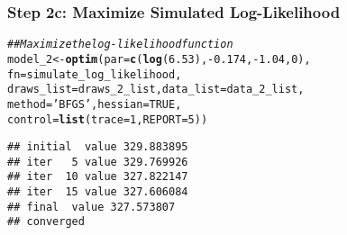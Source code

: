 \documentclass{beamer}\usepackage[]{graphicx}\usepackage[]{color}
\makeatletter
\newcommand{\hlnum}[1]{\textcolor[rgb]{0.686,0.059,0.569}{#1}}%
\newcommand{\hlstr}[1]{\textcolor[rgb]{0.192,0.494,0.8}{#1}}%
\newcommand{\hlcom}[1]{\textcolor[rgb]{0.678,0.584,0.686}{\textit{#1}}}%
\newcommand{\hlopt}[1]{\textcolor[rgb]{0,0,0}{#1}}%
\newcommand{\hlstd}[1]{\textcolor[rgb]{0.345,0.345,0.345}{#1}}%
\newcommand{\hlkwb}[1]{\textcolor[rgb]{0.69,0.353,0.396}{#1}}%
\newcommand{\hlkwc}[1]{\textcolor[rgb]{0.333,0.667,0.333}{#1}}%
\newcommand{\hlkwd}[1]{\textcolor[rgb]{0.737,0.353,0.396}{\textbf{#1}}}%
\newenvironment{kframe}{%
 \def\at@end@of@kframe{}%
 \ifinner\ifhmode%
  \def\at@end@of@kframe{\end{minipage}}%
  \begin{minipage}{\columnwidth}%
 \fi\fi%
 \def\FrameCommand##1{\hskip\@totalleftmargin \hskip-\fboxsep
 \colorbox{shadecolor}{##1}\hskip-\fboxsep
     \hskip-\linewidth \hskip-\@totalleftmargin \hskip\columnwidth}%
 \MakeFramed {\advance\hsize-\width
   \@totalleftmargin\z@ \linewidth\hsize
   \@setminipage}}%
 {\par\unskip\endMakeFramed%
 \at@end@of@kframe}
\newenvironment{knitrout}{}{} %
\makeatother
\begin{document}
\begin{frame}[fragile]\frametitle{Step 2c: Maximize Simulated Log-Likelihood}
\begin{knitrout}\footnotesize
{}\color{fgcolor}\begin{kframe}
\begin{alltt}
\hlcom{## Maximize the log-likelihood function}
\hlstd{model_2} \hlkwb{<-} \hlkwd{optim}\hlstd{(}\hlkwc{par} \hlstd{=} \hlkwd{c}\hlstd{(}\hlkwd{log}\hlstd{(}\hlnum{6.53}\hlstd{),} \hlopt{-}\hlnum{0.174}\hlstd{,} \hlopt{-}\hlnum{1.04}\hlstd{,} \hlnum{0}\hlstd{),}
                 \hlkwc{fn} \hlstd{= simulate_log_likelihood,}
                 \hlkwc{draws_list} \hlstd{= draws_2_list,} \hlkwc{data_list} \hlstd{= data_2_list,}
                 \hlkwc{method} \hlstd{=} \hlstr{'BFGS'}\hlstd{,} \hlkwc{hessian} \hlstd{=} \hlnum{TRUE}\hlstd{,}
                 \hlkwc{control} \hlstd{=} \hlkwd{list}\hlstd{(}\hlkwc{trace} \hlstd{=} \hlnum{1}\hlstd{,} \hlkwc{REPORT} \hlstd{=} \hlnum{5}\hlstd{))}
\end{alltt}
\begin{verbatim}
## initial  value 329.883895 
## iter   5 value 329.769926
## iter  10 value 327.822147
## iter  15 value 327.606084
## final  value 327.573807 
## converged
\end{verbatim}
\end{kframe}
\end{knitrout}
\end{frame}

\end{document}
